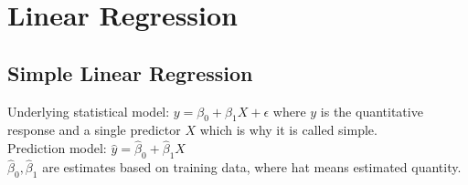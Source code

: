 \documentclass[12pt, letterpaper]{article}
\begin{document}
\section{Linear Regression}
\subsection{Simple Linear Regression}
Underlying statistical model: $y=\beta_0 + \beta_1X + \epsilon$
where $y$ is the quantitative response and a single predictor $X$ which is why it is called simple. \\

\noindent Prediction model: $\hat y = \hat \beta_0 + \hat \beta_1X$ \\
$\hat \beta_0, \hat \beta_1$ are estimates based on training data, where hat means estimated quantity. \\
\end{document}
